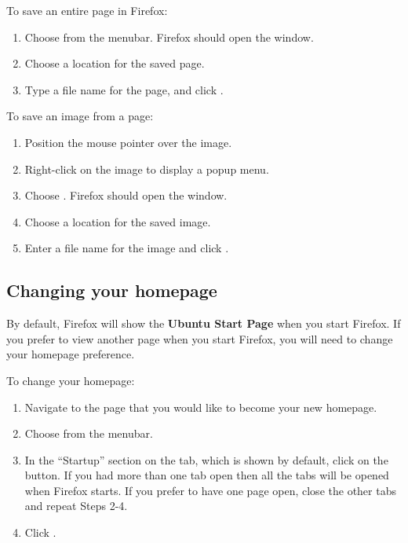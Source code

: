 To save an entire page in Firefox:

\begin{enumerate}
  \item Choose  from the menubar. Firefox should
open the  window.
  \item Choose a location for the saved page.
  \item Type a file name for the page, and click .
\end{enumerate}

\noindent To save an image from a page:

\begin{enumerate}
  \item Position the mouse pointer over the image.
  \item Right-click on the image to display a popup menu.
  \item Choose . Firefox should open the 
 window.
  \item Choose a location for the saved image.
  \item Enter a file name for the image and click .
\end{enumerate}

\subsection{Changing your homepage}

By default, Firefox will show the \textbf{Ubuntu Start Page} when you start
Firefox. If you prefer to view another page when you start Firefox, you 
will need to change your homepage preference.

\vspace{10 mm}


\noindent To change your homepage:

\begin{enumerate}
  \item Navigate to the page that you would like to become your new homepage.
  \item Choose  from the menubar.
  \item In the ``Startup'' section on the  tab, which is shown by
default, click on the  button. If you had more than 
one tab open then all the tabs will be opened when Firefox starts. If you prefer to have one page open, close the other tabs and repeat Steps 2-4.
  \item Click .
\end{enumerate}

